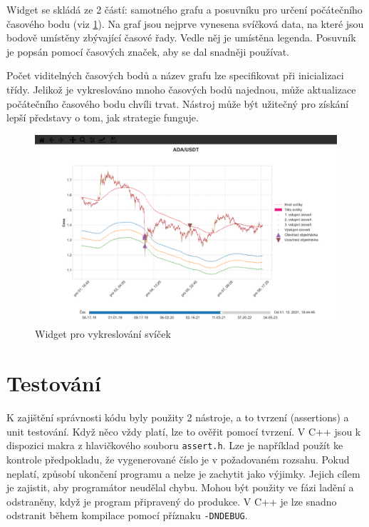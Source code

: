 Widget se skládá ze 2 částí: samotného grafu a posuvníku pro určení počátečního časového bodu (viz \ref{fig:historical-simulation-widget}).
Na graf jsou nejprve vynesena svíčková data, na které jsou bodově umístěny zbývající časové řady.
Vedle něj je umístěna legenda.
Posuvník je popsán pomocí časových značek, aby se dal snadněji používat.

Počet viditelných časových bodů a název grafu lze specifikovat při inicializaci třídy.
Jelikož je vykreslováno mnoho časových bodů najednou, může aktualizace počátečního časového bodu chvíli trvat.
Nástroj může být užitečný pro získání lepší představy o tom, jak strategie funguje.

\begin{figure}[htbp]
\centerline{\includegraphics[scale=0.3]{img/historical-simulation-widget-2.png}}
\caption{Widget pro vykreslování svíček}
\label{fig:historical-simulation-widget}
\end{figure}

\chapter{Testování}
K zajištění správnosti kódu byly použity 2 nástroje, a to tvrzení (assertions) a unit testování.
Když něco vždy platí, lze to ověřit pomocí tvrzení.
V C++ jsou k dispozici makra z hlavičkového souboru \texttt{assert.h}.
Lze je například použít ke kontrole předpokladu, že vygenerované číslo je v požadovaném rozsahu.
Pokud neplatí, způsobí ukončení programu a nelze je zachytit jako výjimky.
Jejich cílem je zajistit, aby programátor neudělal chybu.
Mohou být použity ve fázi ladění a odstraněny, když je program připravený do produkce.
V C++ je lze snadno odstranit během kompilace pomocí příznaku \texttt{-DNDEBUG}.

